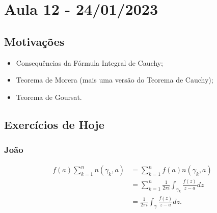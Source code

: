 \documentclass[ComplexAnalysis/complex.tex]{subfiles}
\begin{document}
\section{Aula 12 - 24/01/2023}
\subsection{Motivações}
\begin{itemize}
	\item Consequências da Fórmula Integral de Cauchy;
	\item Teorema de Morera (mais uma versão do Teorema de Cauchy);
	\item Teorema de Goursat.
\end{itemize}
\subsection{Exercícios de Hoje}
\subsubsection{João}
\begin{align*}
	f(a)\sum\limits_{k=1}^{n}n(\gamma_{k}, a) & = \sum\limits_{k=1}^{n}f(a)n(\gamma_{k}, a)                                   \\
	                                          & = \sum\limits_{k=1}^{n}\frac{1}{2\pi i}\int_{\gamma_{k}}^{}\frac{f(z)}{z-a}dz \\
	                                          & = \frac{1}{2\pi i}\int_{\gamma}^{}\frac{f(z)}{z-a}dz.
\end{align*}
\end{document}

